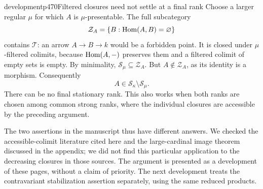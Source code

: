 \begin{dcomment}{development}{p470}{Filtered closures need not settle at a final rank}
Choose a larger regular $\mu$ for which $A$ is $\mu$-presentable. The full subcategory
\[
 \mathcal Z_A=\{B:\operatorname{Hom}(A,B)=\varnothing\}
\]
contains $\mathcal T$: an arrow $A\to B\to k$ would be a forbidden point. It is closed under $\mu$-filtered colimits, because $\operatorname{Hom}(A,-)$ preserves them and a filtered colimit of empty sets is empty. By minimality, $\mathcal S_\mu\subseteq\mathcal Z_A$. But $A\notin\mathcal Z_A$, as its identity is a morphism. Consequently
\[
 A\in\mathcal S_\kappa\setminus\mathcal S_\mu.
\]
There can be no final stationary rank. This also works when both ranks are chosen among common strong ranks, where the individual closures are accessible by the preceding argument.

The two assertions in the manuscript thus have different answers. We checked the accessible-colimit literature cited here and the large-cardinal image theorem discussed in the appendix; we did not find this particular application to the decreasing closures in those sources. The argument is presented as a development of these pages, without a claim of priority. The next development treats the contravariant stabilization assertion separately, using the same reduced products.
\end{dcomment}


